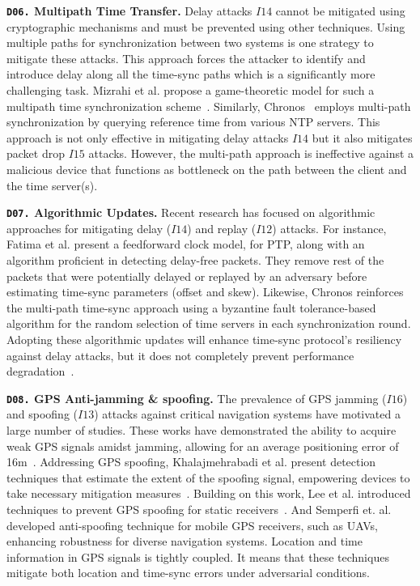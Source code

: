 \noindent\textbf{\texttt{D06.} Multipath Time Transfer.} Delay attacks $I14$ cannot be mitigated using cryptographic mechanisms and must be prevented using other techniques. Using multiple paths for synchronization between two systems is one strategy to mitigate these attacks. This approach forces the attacker to identify and introduce delay along all the time-sync paths which is a significantly more challenging task. Mizrahi et al. propose a game-theoretic model for such a multipath time synchronization scheme~\cite{multi-path-game-theory}. Similarly, Chronos~\cite{net-sync-chronos} employs multi-path synchronization by querying reference time from various NTP servers. This approach is not only effective in mitigating delay attacks $I14$ but it also mitigates packet drop $I15$ attacks. However, the multi-path approach is ineffective against a malicious device that functions as bottleneck on the path between the client and the time server(s).

\noindent\textbf{\texttt{D07.} Algorithmic Updates.} Recent research has focused on algorithmic approaches for mitigating delay ($I14$) and replay ($I12$) attacks. For instance, Fatima et al.\cite{net-sync-feedforward} present a feedforward clock model, for PTP, along with an algorithm proficient in detecting delay-free packets. They remove rest of the packets that were potentially delayed or replayed by an adversary before estimating time-sync parameters (offset and skew). Likewise, Chronos\cite{net-sync-chronos} reinforces the multi-path time-sync approach using a byzantine fault tolerance-based algorithm for the random selection of time servers in each synchronization round. Adopting these algorithmic updates will enhance time-sync protocol's resiliency against delay attacks, but it does not completely prevent performance degradation~\cite{net-sync-feedforward}.

\noindent\textbf{\texttt{D08.} GPS Anti-jamming \& spoofing.} The prevalence of GPS jamming ($I16$) and spoofing ($I13$) attacks against critical navigation systems have motivated a large number of studies. These works have demonstrated the ability to acquire weak GPS signals amidst jamming, allowing for an average positioning error of 16m~\cite{gps-anti-jamming-post-correlation, gps-anti-jamming-post-wavelet}. Addressing GPS spoofing, Khalajmehrabadi et al. present detection techniques that estimate the extent of the spoofing signal, empowering devices to take necessary mitigation measures~\cite{gps-anti-spoofing-tsarm}. Building on this work, Lee et al. introduced techniques to prevent GPS spoofing for static receivers~\cite{gps-anti-spoofing-static}. And Semperfi et. al.~\cite{gps-anti-spoofing-semperfi} developed anti-spoofing technique for mobile GPS receivers, such as UAVs, enhancing robustness for diverse navigation systems. Location and time information in GPS signals is tightly coupled. It means that these techniques mitigate both location and time-sync errors under adversarial conditions.